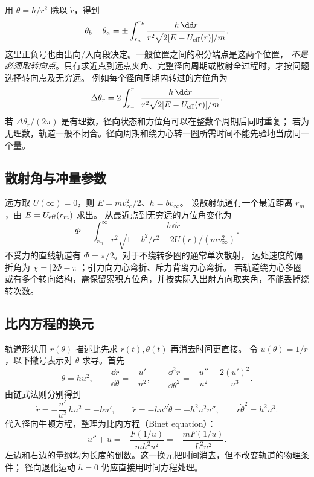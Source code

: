 用 $\dot\theta=h/r^2$ 除以 $\dot r$，得到
\begin{equation}\label{ch11:eq:angle-integral}
 \theta_b-\theta_a=\pm\int_{r_a}^{r_b}
 \frac{h\,\dd r}{r^2\sqrt{2[E-U_{\rm eff}(r)]/m}}.
\end{equation}
这里正负号也由出向/入向段决定。一般位置之间的积分端点是这两个位置，
\emph{不是必须取转向点}。只有求近点到远点夹角、完整径向周期或散射全过程时，才按问题选择转向点及无穷远。
例如每个径向周期内转过的方位角为
\[
 \Delta\theta_r=2\int_{r_-}^{r_+}
 \frac{h\,\dd r}{r^2\sqrt{2[E-U_{\rm eff}(r)]/m}}.
\]
若 $\Delta\theta_r/(2\pi)$ 是有理数，径向状态和方位角可以在整数个周期后同时重复；
若为无理数，轨道一般不闭合。径向周期和绕力心转一圈所需时间不能先验地当成同一个量。

\subsection{散射角与冲量参数}
远方取 $U(\infty)=0$，则 $E=mv_\infty^2/2$、$h=bv_\infty$。
设散射轨道有一个最近距离 $r_m$，由 $E=U_{\rm eff}(r_m)$ 求出。
从最近点到无穷远的方位角变化为
\[
 \Phi=\int_{r_m}^{\infty}
 \frac{b\,\dd r}{r^2\sqrt{1-b^2/r^2-2U(r)/(mv_\infty^2)}}.
\]
不受力的直线轨道有 $\Phi=\pi/2$。对于不绕转多圈的通常单次散射，
远处速度的偏折角为 $\chi=|2\Phi-\pi|$；引力向力心弯折、斥力背离力心弯折。
若轨道绕力心多圈或有多个转向结构，需保留累积方位角，并按实际入出射方向取夹角，不能丢掉绕转次数。

\subsection{比内方程的换元}
轨道形状用 $r(\theta)$ 描述比先求 $r(t),\theta(t)$ 再消去时间更直接。
令 $u(\theta)=1/r$，以下撇号表示对 $\theta$ 求导。首先
\[
 \dot\theta=hu^2,\qquad
 \frac{\dd r}{\dd\theta}=-\frac{u'}{u^2},\qquad
 \frac{\dd^2r}{\dd\theta^2}=-\frac{u''}{u^2}+\frac{2(u')^2}{u^3}.
\]
由链式法则分别得到
\[
 \dot r=-\frac{u'}{u^2}\,hu^2=-hu',\qquad
 \ddot r=-hu''\dot\theta=-h^2u^2u'',\qquad
 r\dot\theta^2=h^2u^3.
\]
代入径向牛顿方程，整理为比内方程（Binet equation）：
\begin{equation}\label{ch11:eq:binet}
 u''+u=-\frac{F(1/u)}{mh^2u^2}
       =-\frac{mF(1/u)}{L^2u^2}.
\end{equation}
左边和右边的量纲均为长度的倒数。这一换元把时间消去，但不改变轨道的物理条件；
径向退化运动 $h=0$ 仍应直接用时间方程处理。


